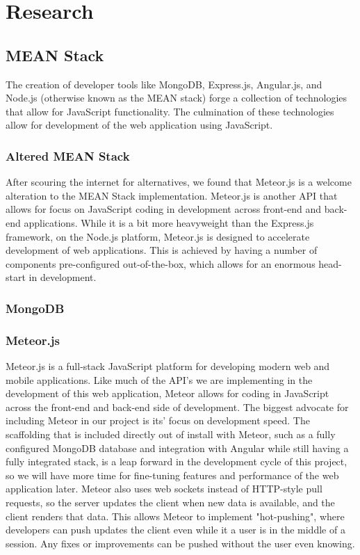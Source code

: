 \documentclass[12pt,a4paper]{report}
\begin{document}
\newpage
\chapter*{Research}
	\section{MEAN Stack}
	The creation of developer tools like MongoDB, Express.js, Angular.js, and Node.js (otherwise known as the MEAN stack) forge a collection of technologies that allow for JavaScript functionality. The culmination of these technologies allow for development of the web application using JavaScript.
		\subsection{Altered MEAN Stack}
		After scouring the internet for alternatives, we found that Meteor.js is a welcome alteration to the MEAN Stack implementation. Meteor.js is another API that allows for focus on JavaScript coding in development across front-end and back-end applications. While it is a bit more heavyweight than the Express.js framework, on the Node.js platform, Meteor.js is designed to accelerate development of web applications. This is achieved by having a number of components pre-configured out-of-the-box, which allows for an enormous head-start in development.
		\subsection{MongoDB}
		\subsection{Meteor.js}
		Meteor.js is a full-stack JavaScript platform for developing modern web and mobile applications. Like much of the API's we are implementing in the development of this web application, Meteor allows for coding in JavaScript across the front-end and back-end side of development. The biggest advocate for including Meteor in our project is its' focus on development speed. The scaffolding that is included directly out of install with Meteor, such as a fully configured MongoDB database and integration with Angular while still having a fully integrated stack, is a leap forward in the development cycle of this project, so we will have more time for fine-tuning features and performance of the web application later. Meteor also uses web sockets instead of HTTP-style pull requests, so the server updates the client when new data is available, and the client renders that data. This allows Meteor to implement "hot-pushing", where developers can push updates the client even while it a user is in the middle of a session. Any fixes or improvements can be pushed without the user even knowing.
\end{document}
